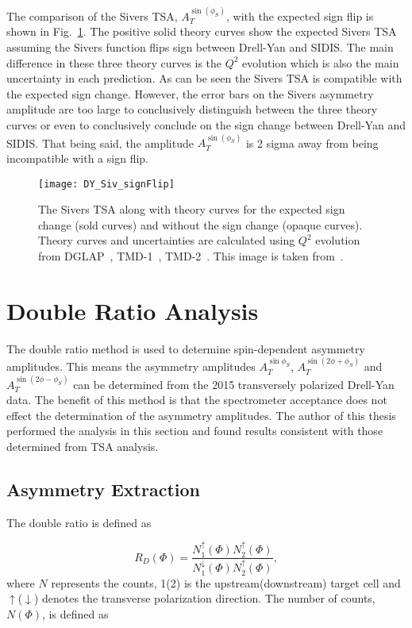 The comparison of the Sivers TSA, $A_T^{\sin(\phi_S)}$, with the expected sign
flip is shown in Fig.~\ref{fig::DY_Siv_signFlip}.  The positive solid theory
curves show the expected Sivers TSA assuming the Sivers function flips sign
between Drell-Yan and SIDIS.  The main difference in these three theory curves
is the $Q^2$ evolution which is also the main uncertainty in each prediction.
As can be seen the Sivers TSA is compatible with the expected sign change.
However, the error bars on the Sivers asymmetry amplitude are too large to
conclusively distinguish between the three theory curves or even to conclusively
conclude on the sign change between Drell-Yan and SIDIS.  That being said, the
amplitude $A_T^{\sin(\phi_S)}$ is 2 sigma away from being incompatible with a
sign flip.

\begin{figure}[h!t]
  \centering \texttt{[image: DY\_Siv\_signFlip]}
  \caption{The Sivers TSA along with theory curves for the expected sign change
    (sold curves) and without the sign change (opaque curves).  Theory curves
    and uncertainties are calculated using $Q^2$ evolution from
    DGLAP~\cite{Anselmino:2016uie}, TMD-1~\cite{Echevarria:2014xaa},
    TMD-2~\cite{Sun:2013hua}.  This image is taken from~\cite{compassDYpaper}.}
  \label{fig::DY_Siv_signFlip}
\end{figure}


\section{Double Ratio Analysis} \label{sec::doubleratio}
The double ratio method is used to determine spin-dependent asymmetry
amplitudes.  This means the asymmetry amplitudes $A^{\sin\phi_S}_T$,
$A^{\sin(2\phi+\phi_S)}_T$ and $A^{\sin(2\phi-\phi_S)}_T$ can be determined from
the 2015 transversely polarized Drell-Yan data.  The benefit of this method is
that the spectrometer acceptance does not effect the determination of the
asymmetry amplitudes.  The author of this thesis performed the analysis in this
section and found results consistent with those determined from TSA analysis.

\subsection{Asymmetry Extraction}
The double ratio is defined as

\begin{equation}
  R_D(\Phi) =
  \frac{N_1^{\uparrow}(\Phi)N_2^{\uparrow}(\Phi)}
       {N_1^{\downarrow}(\Phi)N_2^{\uparrow}(\Phi)},
\end{equation}
\noindent
where $N$ represents the counts, 1(2) is the upstream(downstream) target cell
and $\uparrow$($\downarrow$) denotes the transverse polarization direction.  The
number of counts, $N(\Phi)$, is defined as

